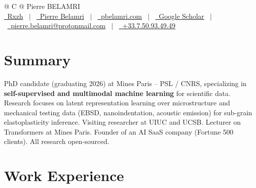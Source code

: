 \documentclass[a4paper,11pt]{article}
\begin{document}
\pagestyle{empty}

\begin{tabularx}{\linewidth}{@{} C @{}}
\Huge{Pierre BELAMRI} \\[2pt]
\small{
\href{https://github.com/Rxzh}{\raisebox{-0.05\height}\faGithub\ Rxzh} \ $|$ \
\href{https://linkedin.com/in/pierre-r-belamri-4a8484191}{\raisebox{-0.05\height}\faLinkedin\ Pierre Belamri} \ $|$ \
\href{https://pbelamri.com}{\raisebox{-0.05\height}\faGlobe\ pbelamri.com} \ $|$ \
\href{https://scholar.google.com/citations?user=8xd25vsAAAAJ&hl=en&oi=ao}{\raisebox{-0.05\height}\faGraduationCap\ Google Scholar} \ $|$ \
\href{mailto:pierre.belamri@protonmail.com}{\raisebox{-0.05\height}\faEnvelope\ pierre.belamri@protonmail.com} \ $|$ \
\href{tel:+33750934949}{\raisebox{-0.05\height}\faMobile\ +33.7.50.93.49.49}
}
\end{tabularx}

\vspace{-2pt}
\section{Summary}
\vspace{1pt}
{\small PhD candidate (graduating 2026) at Mines Paris -- PSL / CNRS, specializing in \textbf{self-supervised and multimodal machine learning} for scientific data. Research focuses on latent representation learning over microstructure and mechanical testing data (EBSD, nanoindentation, acoustic emission) for sub-grain elastoplasticity inference. Visiting researcher at UIUC and UCSB. Lecturer on Transformers at Mines Paris. Founder of an AI SaaS company (Fortune 500 clients). All research open-sourced.}

\section{Work Experience}
\end{document}
